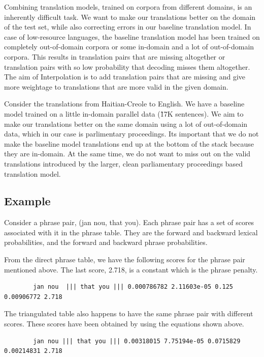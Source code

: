 	Combining translation models, trained on corpora from different domains, is an inherently difficult task. We want to make our translations better on the domain of the test set, while also correcting errors in our baseline translation model. In case of low-resource languages, the baseline translation model has been trained on completely out-of-domain corpora or some in-domain and a lot of out-of-domain corpora. This results in translation pairs that are missing altogether or translation pairs with so low probability that decoding misses them altogether. The aim of Interpolation is to add translation pairs that are missing and give more weightage to translations that are more valid in the given domain. 

	Consider the translations from Haitian-Creole to English. We have a baseline model trained on a little in-domain parallel data (\~17K sentences). We aim to make our translations better on the same domain using a lot of out-of-domain data, which in our case is parlimentary proceedings. Its important that we do not make the baseline model translations end up at the bottom of the stack because they are in-domain. At the same time, we do not want to miss out on the valid translations introduced by the larger, clean parliamentary proceedings based translation model. 

	\subsection{Example}
		Consider a phrase pair, (jan nou, that you). Each phrase pair has a set of scores associated with it in the phrase table. They are the forward and backward lexical probabilities, and the forward and backward phrase probabilities. 

		From the direct phrase table, we have the following scores for the phrase pair mentioned above. The last score, 2.718, is a constant which is the phrase penalty. 
	\begin{verbatim}
		jan nou  ||| that you ||| 0.000786782 2.11603e-05 0.125 0.00906772 2.718 
	\end{verbatim}

		The triangulated table also happens to have the same phrase pair with different scores. These scores have been obtained by using the equations shown above.
	\begin{verbatim}
		jan nou ||| that you ||| 0.00318015 7.75194e-05 0.0715829 0.00214831 2.718
	\end{verbatim}

